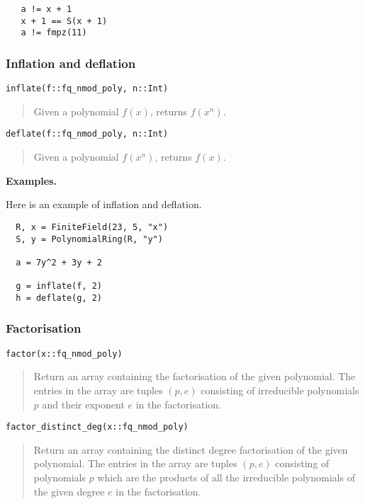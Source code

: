 \documentclass[a4paper,10pt]{article}
\newcommand{\desc}[1]{\vspace{-3mm}\begin{quote}#1\end{quote}}
\begin{document}
{{\begin{lstlisting}
   a != x + 1
   x + 1 == S(x + 1)
   a != fmpz(11)
\end{lstlisting}

\subsubsection{Inflation and deflation}

\begin{lstlisting}
inflate(f::fq_nmod_poly, n::Int)
\end{lstlisting}

\desc{Given a polynomial $f(x)$, returns $f(x^n)$.}

\begin{lstlisting}
deflate(f::fq_nmod_poly, n::Int)
\end{lstlisting}

\desc{Given a polynomial $f(x^n)$, returns $f(x)$.}

\textbf{Examples.}

Here is an example of inflation and deflation.

\begin{lstlisting}
  R, x = FiniteField(23, 5, "x")
  S, y = PolynomialRing(R, "y")

  a = 7y^2 + 3y + 2

  g = inflate(f, 2)
  h = deflate(g, 2)
\end{lstlisting}

\subsubsection{Factorisation}

\begin{lstlisting}
factor(x::fq_nmod_poly)
\end{lstlisting}

\desc{Return an array containing the factorisation of the given polynomial. The entries in
the array are tuples $(p, e)$ consisting of irreducible polynomials $p$ and their exponent
$e$ in the factorisation.}

\begin{lstlisting}
factor_distinct_deg(x::fq_nmod_poly)
\end{lstlisting}

\desc{Return an array containing the distinct degree factorisation of the given polynomial.
The entries in the array are tuples $(p, e)$ consisting of polynomials $p$ which are the
products of all the irreducible polynomials of the given degree $e$ in the factorisation.}

}}
\end{document}
